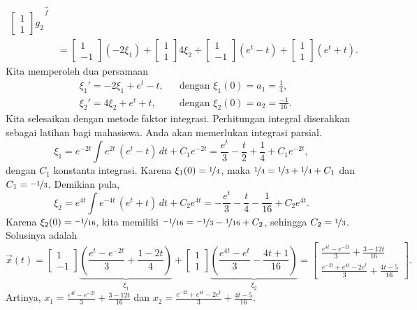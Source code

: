 \begin{example}
\begin{equation*}
\begin{split}
{\begin{bmatrix}
1 \\
1
\end{bmatrix} g_2
}^{\vec{f}}
\\
& =
\begin{bmatrix}
1 \\
-1
\end{bmatrix} (-2\xi_1) +
\begin{bmatrix}
1 \\
1
\end{bmatrix} 4\xi_2
+
\begin{bmatrix}
1 \\
-1
\end{bmatrix} (e^t - t)
+
\begin{bmatrix}
1 \\
1
\end{bmatrix} (e^t + t) .
\end{split}
\end{equation*}
Kita memperoleh dua persamaan
\begin{align*}
& \xi_1' = -2\xi_1 + e^t -t, & & \text{dengan } \xi_1(0) = a_1 = \frac{1}{4} , \\
& \xi_2' = 4\xi_2 + e^t + t, & & \text{dengan } \xi_2(0) = a_2 = \frac{-1}{16} .
\end{align*}
Kita selesaikan dengan metode faktor integrasi.  Perhitungan integral diserahkan
sebagai latihan bagi mahasiswa.  Anda akan memerlukan integrasi parsial.
\begin{equation*}
\xi_1 = e^{-2t}\int e^{2t} \, (e^t-t) \, dt + C_1 e^{-2t} = 
\frac{e^t}{3}-\frac{t}{2}+\frac{1}{4}+C_1 e^{-2t} ,
\end{equation*}
dengan $C_1$ konstanta integrasi.
Karena $\xi_1(0) = \nicefrac{1}{4}$, maka $\nicefrac{1}{4}= \nicefrac{1}{3}
+ \nicefrac{1}{4} + C_1$ dan
$C_1 = \nicefrac{-1}{3}$.
Demikian pula,
\begin{equation*}
\xi_2 = e^{4t}\int e^{-4t} \, (e^t+ t) \, dt + C_2 e^{4t} = 
-\frac{e^t}{3}-\frac{t}{4}-\frac{1}{16} + C_2 e^{4t} .
\end{equation*}
Karena $\xi_2(0) = \nicefrac{-1}{16}$, kita memiliki $\nicefrac{-1}{16}= \nicefrac{-1}{3}
-\nicefrac{1}{16} + C_2$, sehingga
$C_2 = \nicefrac{1}{3}$.
Solusinya adalah
\begin{equation*}
\vec{x}(t)=
\begin{bmatrix}
1 \\
-1
\end{bmatrix}
\underbrace{\left( \frac{e^t-e^{-2t}}{3}+\frac{1-2t}{4} \right)}%
_{\xi_1} +
\begin{bmatrix}
1 \\
1
\end{bmatrix}
\underbrace{\left( \frac{e^{4t}-e^t}{3}-\frac{4t+1}{16} \right)}%
_{\xi_2}
=
\begin{bmatrix}
\frac{e^{4t}-e^{-2t}}{3}+\frac{3-12t}{16} \\
\frac{e^{-2t}+e^{4t}-2e^t}{3}+\frac{4t-5}{16}
\end{bmatrix} .
\end{equation*}
Artinya,
$x_1 = \frac{e^{4t}-e^{-2t}}{3}+\frac{3-12t}{16}$
dan
$x_2 = \frac{e^{-2t}+e^{4t}-2e^t}{3}+\frac{4t-5}{16}$.
\end{example}

